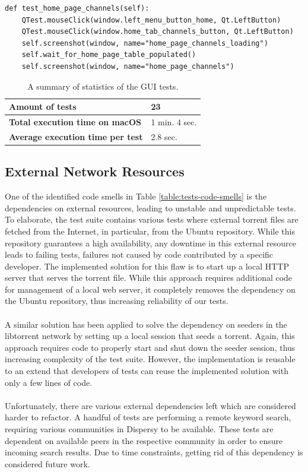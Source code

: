 \begin{lstlisting}[caption={An example of a test that tests the new Qt Tribler GUI.},label={lst:qtest-sample}]
def test_home_page_channels(self):
	QTest.mouseClick(window.left_menu_button_home, Qt.LeftButton)
	QTest.mouseClick(window.home_tab_channels_button, Qt.LeftButton)
	self.screenshot(window, name="home_page_channels_loading")
	self.wait_for_home_page_table_populated()
	self.screenshot(window, name="home_page_channels")
\end{lstlisting}

\begin{table}[h!]
	\centering
	\begin{tabular}{|l|l|}
		\hline
		\textbf{Amount of tests} & 23 \\ \hline
		\textbf{Total execution time on macOS} & 1 min. 4 sec. \\ \hline
		\textbf{Average execution time per test} & 2.8 sec.\\ \hline
	\end{tabular}
	\caption{A summary of statistics of the GUI tests.}
	\label{table:gui-tests-summary}
\end{table}

\subsection{External Network Resources}
\label{subsec:external-network-resources}
One of the identified code smells in Table \ref{table:tests-code-smells} is the dependencies on external resources, leading to unstable and unpredictable tests. To elaborate, the test suite contains various tests where external torrent files are fetched from the Internet, in particular, from the Ubuntu repository. While this repository guarantees a high availability, any downtime in this external resource leads to failing tests, failures not caused by code contributed by a specific developer. The implemented solution for this flaw is to start up a local HTTP server that serves the torrent file. While this approach requires additional code for management of a local web server, it completely removes the dependency on the Ubuntu repository, thus increasing reliability of our tests.\\\\
A similar solution has been applied to solve the dependency on seeders in the libtorrent network by setting up a local session that seeds a torrent. Again, this approach requires code to properly start and shut down the seeder session, thus increasing complexity of the test suite. However, the implementation is reusable to an extend that developers of tests can reuse the implemented solution with only a few lines of code.\\\\
Unfortunately, there are various external dependencies left which are considered harder to refactor. A handful of tests are performing a remote keyword search, requiring various communities in Dispersy to be available. These tests are dependent on available peers in the respective community in order to ensure incoming search results. Due to time constraints, getting rid of this dependency is considered future work.

